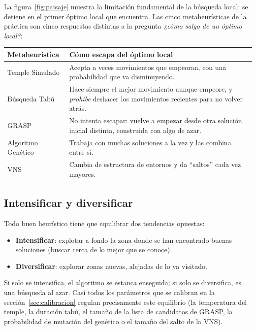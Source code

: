 La figura~\ref{fig:paisaje} muestra la limitación fundamental de la búsqueda local: se
detiene en el primer óptimo local que encuentra. Las cinco metaheurísticas de la práctica son
cinco respuestas distintas a la pregunta \emph{¿cómo salgo de un óptimo local?}:

\begin{center}
\begin{tabular}{@{}lp{11cm}@{}}
\toprule
Metaheurística & Cómo escapa del óptimo local \\ \midrule
Temple Simulado & Acepta a veces movimientos que empeoran, con una probabilidad que va
                  disminuyendo. \\
Búsqueda Tabú & Hace siempre el mejor movimiento aunque empeore, y \emph{prohíbe} deshacer
                  los movimientos recientes para no volver atrás. \\
GRASP & No intenta escapar: vuelve a empezar desde otra solución inicial distinta, construida
                  con algo de azar. \\
Algoritmo Genético & Trabaja con muchas soluciones a la vez y las combina entre sí. \\
VNS & Cambia de estructura de entornos y da ``saltos'' cada vez mayores. \\
\bottomrule
\end{tabular}
\end{center}

\subsection{Intensificar y diversificar}

Todo buen heurístico tiene que equilibrar dos tendencias opuestas:
\begin{itemize}
  \item \textbf{Intensificar}: explotar a fondo la zona donde se han encontrado buenas
        soluciones (buscar cerca de lo mejor que se conoce).
  \item \textbf{Diversificar}: explorar zonas nuevas, alejadas de lo ya visitado.
\end{itemize}
Si solo se intensifica, el algoritmo se estanca enseguida; si solo se diversifica, es una
búsqueda al azar. Casi todos los parámetros que se calibran en la
sección~\ref{sec:calibracion} regulan precisamente este equilibrio (la temperatura del
temple, la duración tabú, el tamaño de la lista de candidatos de GRASP, la probabilidad de
mutación del genético o el tamaño del salto de la VNS).

